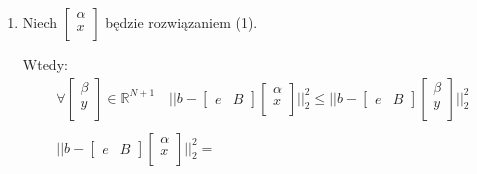 \documentclass[a4paper]{article}
\renewcommand{\le}{\leqslant} %
\newcommand{\R}{\mathbb R} %
\begin{document}
\begin{enumerate}[label=(\alph*)]
         \item
            Niech
            $
               \begin{bmatrix}
                  \alpha \\
                  x      \\
               \end{bmatrix}
            $
            będzie rozwiązaniem (1).

            Wtedy:
            \begin{gather*}
               \forall
                  \begin{bmatrix}
                     \beta \\
                     y \\
                  \end{bmatrix}
                  \in \R^{N + 1} \quad
               ||
                  b -
                  \begin{bmatrix}
                     e & B
                  \end{bmatrix}
                  \begin{bmatrix}
                     \alpha \\
                     x \\
                  \end{bmatrix}
               ||_{2}^{2}
               \le
               ||
                  b -
                  \begin{bmatrix}
                     e & B
                  \end{bmatrix}
                  \begin{bmatrix}
                     \beta \\
                     y \\
                  \end{bmatrix}
               ||_{2}^{2} \\
               \\
               ||
                  b -
                  \begin{bmatrix}
                     e & B
                  \end{bmatrix}
                  \begin{bmatrix}
                     \alpha \\
                     x \\
                  \end{bmatrix}
               ||_{2}^{2} = \\

\end{gather*}
\end{enumerate}
\end{document}
